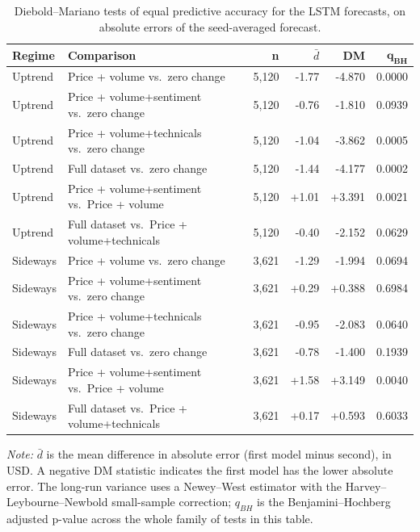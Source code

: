 \begin{table}[H]
\footnotesize
\centering
\begin{threeparttable}
\caption{Diebold--Mariano tests of equal predictive accuracy for the LSTM forecasts, on absolute errors of the seed-averaged forecast.}
\label{tab:lstm_dm_tests}
\renewcommand{\arraystretch}{1.1}
\setlength{\tabcolsep}{6pt}
\begin{tabular}{llrrrr}
\toprule
\textbf{Regime} & \textbf{Comparison} & \textbf{n} & $\bar{d}$ & \textbf{DM} & $\bm{q_{BH}}$ \\
\midrule
Uptrend & Price + volume vs.\ zero change & 5,120 & -1.77 & -4.870 & 0.0000 \\
Uptrend & Price + volume+sentiment vs.\ zero change & 5,120 & -0.76 & -1.810 & 0.0939 \\
Uptrend & Price + volume+technicals vs.\ zero change & 5,120 & -1.04 & -3.862 & 0.0005 \\
Uptrend & Full dataset vs.\ zero change & 5,120 & -1.44 & -4.177 & 0.0002 \\
Uptrend & Price + volume+sentiment vs.\ Price + volume & 5,120 & +1.01 & +3.391 & 0.0021 \\
Uptrend & Full dataset vs.\ Price + volume+technicals & 5,120 & -0.40 & -2.152 & 0.0629 \\
\midrule
Sideways & Price + volume vs.\ zero change & 3,621 & -1.29 & -1.994 & 0.0694 \\
Sideways & Price + volume+sentiment vs.\ zero change & 3,621 & +0.29 & +0.388 & 0.6984 \\
Sideways & Price + volume+technicals vs.\ zero change & 3,621 & -0.95 & -2.083 & 0.0640 \\
Sideways & Full dataset vs.\ zero change & 3,621 & -0.78 & -1.400 & 0.1939 \\
Sideways & Price + volume+sentiment vs.\ Price + volume & 3,621 & +1.58 & +3.149 & 0.0040 \\
Sideways & Full dataset vs.\ Price + volume+technicals & 3,621 & +0.17 & +0.593 & 0.6033 \\
\bottomrule
\end{tabular}
\begin{tablenotes}[flushleft]
\footnotesize
\item \textit{Note:} $\bar{d}$ is the mean difference in absolute error (first model minus second), in USD. A negative DM statistic indicates the first model has the lower absolute error. The long-run variance uses a Newey--West estimator with the Harvey--Leybourne--Newbold small-sample correction; $q_{BH}$ is the Benjamini--Hochberg adjusted p-value across the whole family of tests in this table.
\end{tablenotes}
\end{threeparttable}
\end{table}